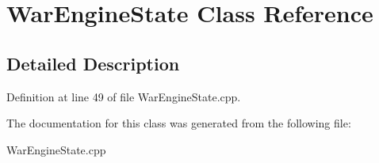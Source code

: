 \hypertarget{classWarEngineState}{}\section{War\+Engine\+State Class Reference}
\label{classWarEngineState}


\subsection{Detailed Description}


Definition at line 49 of file War\+Engine\+State.\+cpp.



The documentation for this class was generated from the following file\+:\begin{DoxyCompactItemize}
\item 
War\+Engine\+State.\+cpp\end{DoxyCompactItemize}
